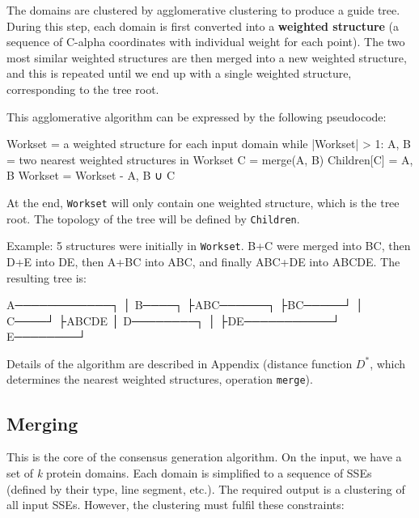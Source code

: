 \documentclass[12pt,draft]{article}
\let\oldtexttt\texttt
\renewcommand{\texttt}[1]{\textcolor{CodeColor}{\oldtexttt{#1}}}
\renewenvironment{verbatim}
    {\color{CodeColor}\begin{oldverbatim}}
    {\end{oldverbatim}}
\begin{document}
The domains are clustered by agglomerative clustering to produce a guide
tree. During this step, each domain is first converted into a
\textbf{weighted structure} (a sequence of C-alpha coordinates with
individual weight for each point). The two most similar weighted
structures are then merged into a new weighted structure, and this is
repeated until we end up with a single weighted structure, corresponding
to the tree root.

This agglomerative algorithm can be expressed by the following
pseudocode:

\begin{verbatim}
    Workset = { a weighted structure for each input domain }  
    while |Workset| > 1:  
        A, B = two nearest weighted structures in Workset
        C = merge(A, B)  
        Children[C] = {A, B}
        Workset = Workset - {A, B} ∪ {C}
\end{verbatim}

At the end, \texttt{Workset} will only contain one weighted structure,
which is the tree root. The topology of the tree will be defined by
\texttt{Children}.

Example: 5 structures were initially in \texttt{Workset}. B+C were
merged into BC, then D+E into DE, then A+BC into ABC, and finally ABC+DE
into ABCDE. The resulting tree is:

\begin{verbatim}
    A────────────┐
                 │
    B────┐       ├ABC──────┐
         ├BC─────┘         │
    C────┘                 ├ABCDE
                           │
    D────────┐             │
             ├DE───────────┘
    E────────┘
\end{verbatim}

Details of the algorithm are described in Appendix (distance function
\(D^{*}\), which determines the nearest weighted structures, operation
\texttt{merge}).

\hypertarget{merging}{%
\subsection{Merging}\label{merging}}

This is the core of the consensus generation algorithm. On the input, we
have a set of \emph{k} protein domains. Each domain is simplified to a
sequence of SSEs (defined by their type, line segment, etc.). The
required output is a clustering of all input SSEs. However, the
clustering must fulfil these constraints:
\end{document}
